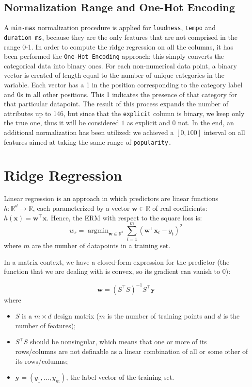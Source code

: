 \documentclass{article}
\DeclareMathOperator*{\argmin}{argmin}
\begin{document}
\subsection{Normalization Range and One-Hot Encoding}
A \texttt{min-max} normalization procedure is applied for \texttt{loudness}, \texttt{tempo} and  \texttt{duration\_ms}, because they are the only features that are not comprised in the range 0-1.\newline
In order to compute the ridge regression on all the columns, it has been performed the \texttt{One-Hot Encoding} approach: this simply converts the categorical data into binary ones. For each non-numerical data point, a binary vector is created of length equal to the number of unique categories in the variable. Each vector has a 1 in the position corresponding to the category label and 0s in all other positions. This 1 indicates the presence of that category for that particular datapoint. The result of this process expands the number of attributes up to 146, but since that the \texttt{explicit} column is binary, we keep only the true one, thus it will be considered $1$ as explicit and $0$ not. 
In the end, an additional normalization has been utilized: we achieved a $[0,100]$ interval on all features aimed at taking the same range of \texttt{popularity.}

\section{Ridge Regression}
Linear regression is an approach in which predictors are linear functions $h: \mathbb{R}^d \rightarrow \mathbb{R}$, each parameterized by a vector $\boldsymbol{w} \in \mathbb{R}$ of real coefficients: $h(\boldsymbol{x}) = \boldsymbol{w}^\top\boldsymbol{x}$. Hence, the ERM with respect to the square loss is: \begin{equation}
w_s = \argmin_{\boldsymbol{w} \in \mathbb{R}^d}\sum_{i = 1}^m(\boldsymbol{w}^\top \boldsymbol{x}_t - y_t)^2
\end{equation}
where $m$ are the number of datapoints in a training set.
    
In a matrix context, we have a closed-form expression for the predictor (the function that we are dealing with is convex, so its gradient can vanish to $0$):
    
\begin{equation}
	\boldsymbol{w} = (S^\top S)^{-1}S^\top \boldsymbol{y}
\end{equation}
where 
\begin{itemize}
	\item $S$ is a $m \times d$ design matrix ($m$ is the number of training points and $d$ is the number of features);
	\item $S^\top S$ should be nonsingular, which means that one or more of its rows/columns are not definable as a linear combination of all or some other of its rows/columns;
	\item $\boldsymbol{y} = (y_1, \dots , y_m)$, the label vector of the training set.
\end{itemize}
    
\end{document}
